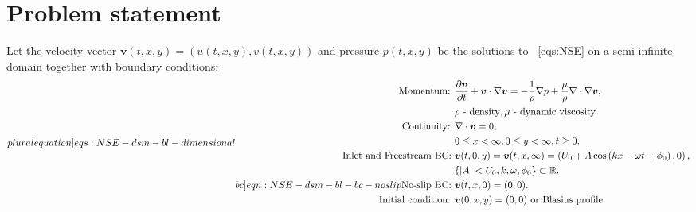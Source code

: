 \documentclass{article}
\numberwithin{equation}{section}
\begin{document}
\pagebreak
\section{Problem statement}\label{sec:problem-statement-dimentional}
Let the velocity vector $\boldsymbol{v}(t,x,y)=(u(t,x,y),v(t,x,y))$ and pressure $p(t,x,y)$ be the solutions to ~\cref{eqs:NSE} on a semi-infinite domain together with boundary conditions:
\begin{subequations}
\label[pluralequation]{eqs:NSE-dsm-bl-dimensional}
\begin{align}
\label{eqn:momentum-dimensional}
\text{Momentum: }	&\frac{\partial \boldsymbol{v}}{\partial t} + \boldsymbol{v} \cdot \nabla \boldsymbol{v} = -\frac{1}{\rho}\nabla p + {\frac{\mu}{\rho}} \nabla \cdot \nabla \boldsymbol{v},\\
&\rho\text{ - density}, \mu\text{ - dynamic viscosity.}\notag\\
\label{eqn:continuity-dsm-bl}
\text{Continuity: }	& \nabla \cdot \boldsymbol{v} = 0, \\ 
					&0\leq x < \infty, 0\leq y <\infty, t\geq0.\notag\\
\label{eqn:NSE-dsm-bl-bc-freestream}
\text{Inlet and Freestream BC: } 	& \boldsymbol{v}(t,0,y)=\boldsymbol{v}(t,x,\infty)=\left(U_0 + A\cos\left( kx -\omega t + \phi_0 \right),0\right),\\
									& \{|A|<U_0,k,\omega, \phi_0\}\subset \mathbb{R}.\notag\\
\label[bc]{eqn:NSE-dsm-bl-bc-noslip}
\text{No-slip BC: } & \boldsymbol{v}(t,x,0)=(0,0). \\
\text{Initial condition: } &\boldsymbol{v}(0,x,y)=(0,0) \text{ or Blasius profile.}
\end{align}
\end{subequations}



\end{document}
